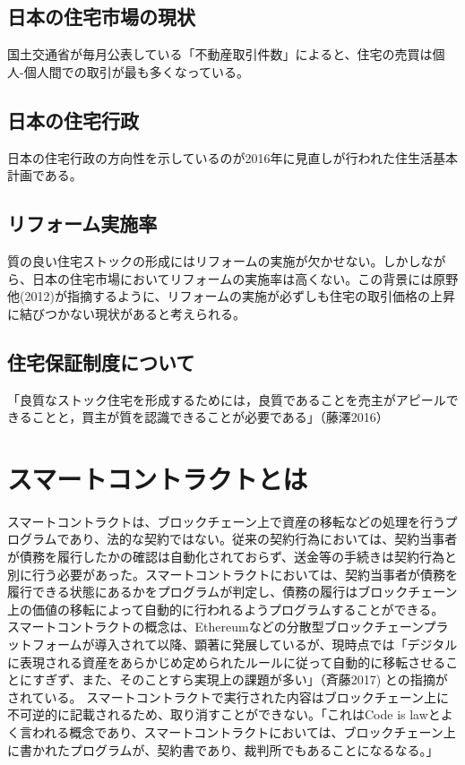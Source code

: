 \documentclass[a4paper,10.5pt]{jlreq}
\begin{document}
\subsection{日本の住宅市場の現状}
国土交通省が毎月公表している「不動産取引件数」によると、住宅の売買は個人-個人間での取引が最も多くなっている。

\subsection{日本の住宅行政}
日本の住宅行政の方向性を示しているのが2016年に見直しが行われた住生活基本計画である。

\subsection{リフォーム実施率}
質の良い住宅ストックの形成にはリフォームの実施が欠かせない。しかしながら、日本の住宅市場においてリフォームの実施率は高くない。この背景には原野他(2012)が指摘するように、リフォームの実施が必ずしも住宅の取引価格の上昇に結びつかない現状があると考えられる。

\subsection{住宅保証制度について}

「良質なストック住宅を形成するためには，良質であることを売主がアピールできることと，買主が質を認識できることが必要である」（藤澤2016）

\section{スマートコントラクトとは}
スマートコントラクトは、ブロックチェーン上で資産の移転などの処理を行うプログラムであり、法的な契約ではない。従来の契約行為においては、契約当事者が債務を履行したかの確認は自動化されておらず、送金等の手続きは契約行為と別に行う必要があった。スマートコントラクトにおいては、契約当事者が債務を履行できる状態にあるかをプログラムが判定し、債務の履行はブロックチェーン上の価値の移転によって自動的に行われるようプログラムすることができる。
スマートコントラクトの概念は、Ethereumなどの分散型ブロックチェーンプラットフォームが導入されて以降、顕著に発展しているが、現時点では「デジタルに表現される資産をあらかじめ定められたルールに従って自動的に移転させることにすぎず、また、そのことすら実現上の課題が多い」（斉藤2017)
との指摘がされている。
スマートコントラクトで実行された内容はブロックチェーン上に不可逆的に記載されるため、取り消すことができない。「これはCode is lawとよく言われる概念であり、スマートコントラクトにおいては、ブロックチェーン上に書かれたプログラムが、契約書であり、裁判所でもあることになるなる。」
\end{document}
